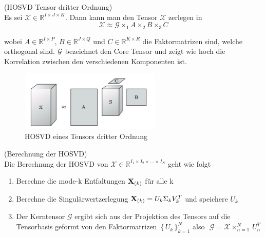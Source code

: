 \begin{Beispiel} (HOSVD Tensor dritter Ordnung) \\
Es sei $\pmb{\mathscr{X}} \in \mathbb{R}^{I \times J \times K}$.  Dann kann man den Tensor $\pmb{\mathscr{X}}$ zerlegen in 
\begin{equation}
{\pmb{\mathscr{X}}} \approx  \pmb{\mathscr{G}}  \times_1 A \times_2 B \times_3 C 
\end{equation}

wobei $A \in \mathbb{R}^{I \times P}$, $B \in \mathbb{R}^{J \times Q}$ und $C \in \mathbb{R}^{K \times R}$ die Faktormatrizen sind, welche orthogonal sind.
${\cal G}$ bezeichnet den Core Tensor und zeigt wie hoch die Korrelation zwischen den verschiedenen Komponenten ist.

\end{Beispiel}
\begin{figure}[ht]
	\centering
  \includegraphics[width=0.6\textwidth]{hosvdTensor.png}
	\caption{HOSVD eines Tensors dritter Ordnung \cite[475]{Kolda}}
	\label{fig:hosvdTensor}
\end{figure}

\newpage
\begin{framed}
\begin{Bemerkung} (Berechnung der HOSVD) \\
Die Berechnung der HOSVD von ${\pmb{\mathscr{X}}}  \in \mathbb{R}^{I_1 \times I_2 \times \dots \times I_N}$ geht wie folgt
\begin{enumerate}
\item Berechne die mode-k Entfaltungen $\bold{X}_{(k)}$ für alle k
\item Berechne die Singulärwertzerlegung $\bold{X}_{(k)}=U_k \Sigma_k V_k^T$ und speichere $U_k$
\item Der Kerntensor ${\pmb{\mathscr{G}}} $ ergibt sich aus der Projektion des Tensors auf die Tensorbasis geformt von den Faktormatrizen  $ \, \{ \, U_k \, \}_{k=1}^{N}$  also $\, \, {\pmb{\mathscr{G}}} ={\pmb{\mathscr{X}}}  \times_{n=1}^{N} \, U_n^T$
\end{enumerate}
\end{Bemerkung}
\end{framed}

